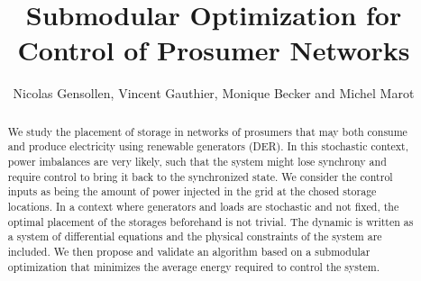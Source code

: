 \documentclass[conference]{IEEEtran}
\begin{document}
\pagestyle{plain}
\title{Submodular Optimization for Control of Prosumer Networks}


\author{Nicolas Gensollen, Vincent Gauthier, Monique Becker and Michel Marot  \\
}


\maketitle


\begin{abstract}

We study the placement of storage in networks of prosumers that may both consume and produce electricity using renewable generators (DER). In this stochastic context, power imbalances are very likely, such that the system might lose synchrony and require control to bring it back to the synchronized state. We consider the control inputs as being the amount of power injected in the grid at the chosed storage locations. In a context where generators and loads are stochastic and not fixed, the optimal placement of the storages beforehand is not trivial. The dynamic is written as a system of differential equations and the physical constraints of the system are included. We then propose and validate an algorithm based on a submodular optimization that minimizes the average energy required to control the system.

\end{abstract}
\end{document}
